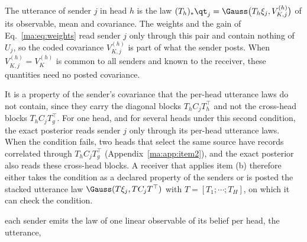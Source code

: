 The utterance of sender $j$ in head $h$ is the law $(T_h)_*\qt_j=\Gauss\bigl(T_h\xi_j,V^{(h)}_{K,j}\bigr)$ of its observable, mean and covariance. The weights and the gain of Eq.~\eqref{ma:eq:weights} read sender $j$ only through this pair and contain nothing of $U_j$, so the coded covariance $V^{(h)}_{K,j}$ is part of what the sender posts. When $V^{(h)}_{K,j}=V^{(h)}_K$ is common to all senders and known to the receiver, these quantities need no posted covariance.

It is a property of the sender's covariance that the per-head utterance laws do not contain, since they carry the diagonal blocks $T_hC_jT_h^\top$ and not the cross-head blocks $T_hC_jT_g^\top$. For one head, and for several heads under this second condition, the exact posterior reads sender $j$ only through its per-head utterance laws. When the condition fails, two heads that select the same source have records correlated through $T_hC_jT_g^\top$ (Appendix~\ref{ma:app:item2}), and the exact posterior also reads these cross-head blocks. A receiver that applies item (b) therefore either takes the condition as a declared property of the senders or is posted the stacked utterance law $\Gauss(T\xi_j,TC_jT^\top)$ with $T=[T_1;\cdots;T_H]$, on which it can check the condition.

each sender emits the law of one linear observable of its belief per head, the utterance,
